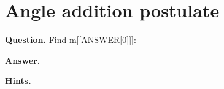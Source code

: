 \documentclass{article}
\begin{document}
\section*{Angle addition postulate}
\textbf{Question.} Find m[[ANSWER[0]]]:

\textbf{Answer.} 

\textbf{Hints.}
\begin{itemize}

\end{itemize}
\end{document}
